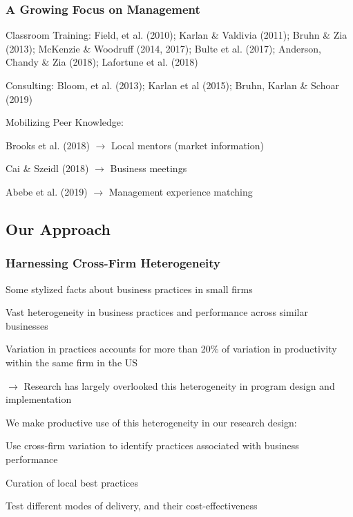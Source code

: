 \documentclass[hideothersubsections, usenames,dvipsnames,11pt]{beamer}
\newenvironment{itemize_2pt}{\itemize\addtolength{\itemsep}{2pt}}{\enditemize}
\begin{document}
\begin{frame}
\frametitle{A Growing Focus on Management}
\begin{itemize_2pt}
\item \textcolor{bdf}{Classroom Training}: Field, et al. (2010); Karlan \& Valdivia (2011); Bruhn \& Zia (2013); McKenzie \& Woodruff (2014, 2017); Bulte et al. (2017); Anderson, Chandy \& Zia (2018); Lafortune et al. (2018)
\citep{Karlan2011}
\vspace{0.1in}
\item \textcolor{bdf}{Consulting}: Bloom, et al. (2013); Karlan et al (2015); Bruhn, Karlan \& Schoar (2019)
\vspace{0.1in}

\item \textcolor{bdf}{Mobilizing Peer Knowledge}:
    \begin{itemize_2pt}
    \item Brooks et al. (2018) $\rightarrow$ Local mentors (market information)
    \item Cai \& Szeidl (2018) $\rightarrow$ Business meetings
    \item Abebe et al. (2019) $\rightarrow$ Management experience matching
    \end{itemize_2pt}
    \vspace{0.1in}
\end{itemize_2pt}
\end{frame}

\subsection{Our Approach}
\begin{frame}
\frametitle{Harnessing Cross-Firm Heterogeneity}
Some stylized facts about business practices in small firms
\begin{itemize_2pt}
	\item Vast heterogeneity in business practices and performance across similar businesses \citep{deMel2009}
	\item Variation in practices accounts for more than 20\% of variation in productivity within the same firm in the US \citep{Bloom2019}
	\item[] $\rightarrow$ Research has largely overlooked this heterogeneity in program design and implementation
\end{itemize_2pt}

\vspace{0.5em}
\pause

We \textcolor{bdf}{make productive use of this heterogeneity} in our research design: 
\begin{itemize_2pt}
	\item Use cross-firm variation to identify \textcolor{bdf}{practices associated with business performance}
	\item \textcolor{bdf}{Curation} of local best practices
	\item Test different \textcolor{bdf}{modes of delivery}, and their cost-effectiveness
\end{itemize_2pt}

\end{frame}
\end{document}
